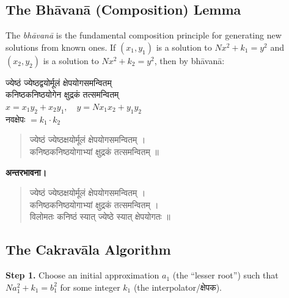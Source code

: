 \documentclass[11pt,a4paper]{article}
\newcommand{\dev}[1]{{\devanagarifont #1}}
\newcommand{\vs}{\vspace{0.5em}}
\newenvironment{sanskritverse}{%
  \begin{quote}\devanagarifont\textcolor{versecolor}%
}{%
  \end{quote}
}
\begin{document}
\newpage

\subsection*{The Bh\={a}van\={a} (Composition) Lemma}

The \textit{bh\={a}van\={a}} is the fundamental composition principle for generating new solutions from known ones. If $(x_1, y_1)$ is a solution to $Nx^2 + k_1 = y^2$ and $(x_2, y_2)$ is a solution to $Nx^2 + k_2 = y^2$, then by bh\={a}van\={a}:

\begin{center}
\dev{ज्येष्ठं ज्येष्ठद्वयोर्मूलं क्षेपयोगसमन्वितम्}\\[0.3em]
\dev{कनिष्ठकनिष्ठयोगेन क्षुद्रकं तत्समन्वितम्}\\[0.3em]
\dev{$x = x_1 y_2 + x_2 y_1, \quad y = N x_1 x_2 + y_1 y_2$}\\[0.3em]
\dev{नवक्षेपः $= k_1 \cdot k_2$}
\end{center}

\vs

\begin{sanskritverse}
\dev{ज्येष्ठं ज्येष्ठक्षयोर्मूलं क्षेपयोगसमन्वितम् ।}\\
\dev{कनिष्ठकनिष्ठयोगाभ्यां क्षुद्रकं तत्समन्वितम् ॥}
\end{sanskritverse}

\vs

\noindent\textbf{\dev{अन्तरभावना।}}

\begin{sanskritverse}
\dev{ज्येष्ठं ज्येष्ठक्षयोर्मूलं क्षेपयोगसमन्वितम् ।}\\
\dev{कनिष्ठकनिष्ठयोगाभ्यां क्षुद्रकं तत्समन्वितम् ।}\\
\dev{विलोमतः कनिष्ठं स्यात् ज्येष्ठे स्यात् क्षेपयोगतः ॥}
\end{sanskritverse}

\newpage

\subsection*{The Cakrav\={a}la Algorithm}

\noindent\textbf{Step 1.} Choose an initial approximation $a_1$ (the ``lesser root'') such that $Na_1^2 + k_1 = b_1^2$ for some integer $k_1$ (the interpolator/\dev{क्षेपक}).
\end{document}
